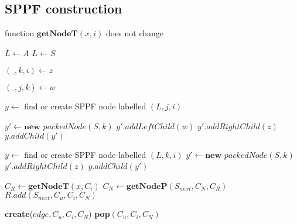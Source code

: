 \documentclass[runningheads,a4paper]{llncs}
\begin{document}
\subsection{SPPF construction}
function $\textbf{getNodeT}(x,i)$ does not change


\begin{algorithmic}   
        \State {}
    \Else
    
            \State $L \gets A$
        \Else
            \State $L \gets S$
        \EndIf
    
        \State $(\_, k, i) \gets z$
    
            \State $(\_, j, k) \gets w$
    
            \State $y \gets$ find or create SPPF node labelled $(L, j, i)$  
    
                \State $y\prime \gets \textbf{new}$ $packedNode(S, k)$
                \State $y\prime.addLeftChild(w)$
                \State $y\prime.addRightChild(z)$
                \State $y.addChild(y\prime)$
            \EndIf
    
        \Else
            \State $y \gets$ find or create SPPF node labelled $(L, k, i)$ 
                \State $y\prime \gets \textbf{new}$ $packedNode(S, k)$
                \State $y\prime.addRightChild(z)$
                \State $y.addChild(y\prime)$
            \EndIf
    
        \EndIf
    
        \State {}
    \EndIf
\EndFunction
\end{algorithmic}

\begin{algorithmic}
            \State $C_{R} \gets \textbf{getNodeT}(x, C_{i})$
            \EndIf
            \State $C_{N} \gets \textbf{getNodeP}(S_{next}, C_{N}, C_{R})$
            \State $R.add(S_{next}, C_{u}, C_{i}, C_{N})$
        \EndCase
    
            \State \textbf{create}($edge,  C_{u}, C_{i}, C_{N}$)
        \EndCase
        \EndSwitch
            \State \textbf{pop}$(C_{u},C_{i},C_{N})$
        \EndIf
    \EndFor
    \EndWhile
\EndFunction
\end{algorithmic}
\end{document}
